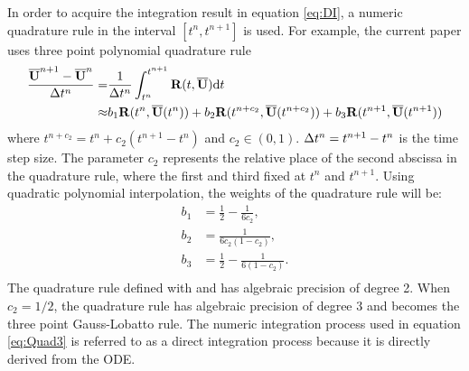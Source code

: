 In order to acquire the integration result in equation
\eqref{eq:DI}, a numeric quadrature rule in the interval
$[t^n, t^{n+1}]$ is used. For example, the current paper
uses three point polynomial quadrature rule
\begin{equation}
    \label{eq:Quad3}
    \begin{aligned}
        \frac{\overline{\mathbf{U}}^{n+1} - \overline{\mathbf{U}}^{n}}{\mathrm\Delta t^n} = & \frac{1}{\mathrm\Delta t^n}
        \int_{t^n}^{t^{n+1}}{
        \mathbf{R}(t, \overline{\mathbf{U}}) \dd t
        }                                                           \\ \approx &
        b_1\mathbf{R}(t^n, \overline{\mathbf{U}}(t^n))
        +
        b_2\mathbf{R}(t^{n+c_2}, \overline{\mathbf{U}}(t^{n+c_2}))
        +
        b_3\mathbf{R}(t^{n+1}, \overline{\mathbf{U}}(t^{n+1}))
    \end{aligned}
\end{equation}
where $t^{n+c_2} = t^{n} + c_2 (t^{n+1} - t^n)$ and $c_2\in(0,1)$.
$\mathrm\Delta t^n=t^{n+1} - t^n$ is
the time step size.
The parameter $c_2$ represents the relative place of the second abscissa
in the quadrature rule, where the first and third fixed at $t^{n}$ and $t^{n + 1}$.
Using quadratic polynomial interpolation,
the weights of the quadrature rule will be:
\begin{equation}
    \begin{aligned}
        b_1 & = \frac{1}{2} - \frac{1}{6{c_2}},     \\
        b_2 & = \frac{1}{6{c_2}(1-{c_2})},          \\
        b_3 & = \frac{1}{2} - \frac{1}{6(1-{c_2})}. \\
    \end{aligned}
    \label{eq:integ0}
\end{equation}
The quadrature rule defined with
 and  has algebraic precision
of degree 2. When $c_2=1/2$, the quadrature rule has algebraic precision of
degree 3 and becomes the three point Gauss-Lobatto rule.
The numeric integration process used in equation \eqref{eq:Quad3}
is referred to as a direct integration process because it is
directly derived from the ODE.



